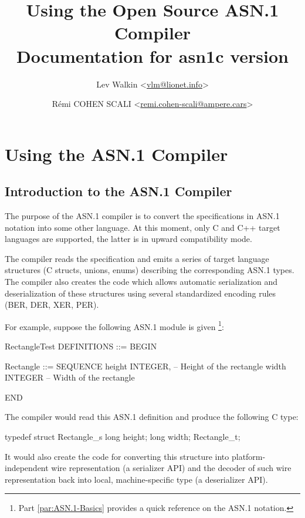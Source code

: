 \documentclass[english,oneside,12pt]{book}
\begin{document}
\title{Using the Open Source ASN.1 Compiler\\
\vspace*{0.4cm}
\Large Documentation for asn1c version \asnver{}}
\author{
	Lev Walkin <\href{mailto:vlm@lionet.info?Subject=asn1c}{vlm@lionet.info}> 
	\and 
	Rémi COHEN SCALI  <\href{mailto:remi.cohen-scali@ampere.cars?Subject=asn1c}{remi.cohen-scali@ampere.cars}>
}

\pagestyle{fancy}
\fancyhead[L]{\leftmark}
\maketitle

\tableofcontents{}

\part{Using the ASN.1 Compiler}


\chapter{Introduction to the ASN.1 Compiler}

The purpose of the ASN.1 compiler is to convert the specifications
in ASN.1 notation into some other language. At this moment, only C
and C++ target languages are supported, the latter is in upward compatibility
mode.

The compiler reads the specification and emits a series of target
language structures (C structs, unions, enums) describing the corresponding
ASN.1 types. The compiler also creates the code which allows automatic
serialization and deserialization of these structures using several
standardized encoding rules (BER, DER, XER, PER).

For example, suppose the following ASN.1 module is given%
\footnote{Part \ref{par:ASN.1-Basics} provides a quick reference
on the ASN.1 notation.}:
\begin{asn}
RectangleTest DEFINITIONS ::= BEGIN

Rectangle ::= SEQUENCE {
    height  INTEGER,        -- Height of the rectangle
    width   INTEGER         -- Width of the rectangle
}

END
\end{asn}
The compiler would read this ASN.1 definition and produce the following
C type:
\begin{codesample}
typedef struct Rectangle_s {
    long height;
    long width;
} Rectangle_t;
\end{codesample}
It would also create the code for converting this structure into platform-independent
wire representation (a serializer API) and the decoder of such wire
representation back into local, machine-specific type (a deserializer
API).
\end{document}
